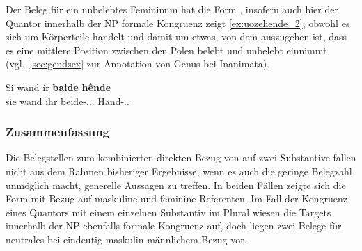 Der Beleg für ein unbelebtes Femininum hat die Form , insofern auch
hier der Quantor innerhalb der NP formale Kongruenz zeigt
\cref{ex:uozehende_2}, obwohl es sich um Körperteile handelt und damit um
etwas, von dem auszugehen ist, dass es eine mittlere Position zwischen den
Polen belebt und unbelebt einnimmt (vgl.~\cref{sec:gendsex} zur Annotation von
Genus bei Inanimata).

\begin{exe}

	\ex \gll Si wand ír \textbf{baide} \textbf{hênde} \\
			sie wand ihr beide-\Acc.\Pl.\FemI.\St{} Hand-\Acc.\Pl.\FemI{} \\
		\begin{taggedline}{\parencites[\pno~6\rb, 19]{kc:K}[vgl.][913]{schroeder1895}}
		\trans {}
		\end{taggedline}
		\label{ex:uozehende_2}
\end{exe}


\subsubsection{Zusammenfassung}

Die Belegstellen zum kombinierten direkten Bezug von \mbox{} auf
zwei Substantive fallen nicht aus dem Rahmen bisheriger Ergebnisse, wenn es
auch die geringe Belegzahl unmöglich macht, generelle Aussagen zu treffen. In
beiden Fällen zeigte sich die Form  mit Bezug auf maskuline und
feminine Referenten. Im Fall der Kongruenz eines Quantors mit einem einzelnen
Substantiv im Plural wiesen die Targets innerhalb der NP ebenfalls formale
Kongruenz auf, doch liegen zwei Belege für neutrales  bei
eindeutig maskulin-männlichem Bezug vor.

